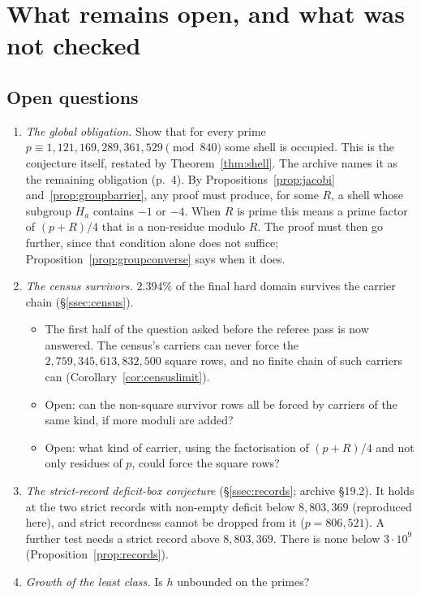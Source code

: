\section{What remains open, and what was not checked}\label{sec:open}

\subsection{Open questions}

\begin{enumerate}[label=\arabic*.]
\item \emph{The global obligation.} Show that for every prime $p\equiv1,121,169,289,361,529\pmod{840}$ some shell is occupied. This is the conjecture itself, restated by Theorem~\ref{thm:shell}. The archive names it as the remaining obligation (p.~4). By Propositions~\ref{prop:jacobi} and~\ref{prop:groupbarrier}, any proof must produce, for some $R$, a shell whose subgroup $H_a$ contains $-1$ or $-4$. When $R$ is prime this means a prime factor of $(p+R)/4$ that is a non-residue modulo $R$. The proof must then go further, since that condition alone does not suffice; Proposition~\ref{prop:groupconverse} says when it does.
\item \emph{The census survivors.} $2.394\%$ of the final hard domain survives the carrier chain (§\ref{ssec:census}).
\begin{itemize}
\item The first half of the question asked before the referee pass is now answered. The census's carriers can never force the $2{,}759{,}345{,}613{,}832{,}500$ square rows, and no finite chain of such carriers can (Corollary~\ref{cor:censuslimit}).
\item Open: can the non-square survivor rows all be forced by carriers of the same kind, if more moduli are added?
\item Open: what kind of carrier, using the factorisation of $(p+R)/4$ and not only residues of $p$, could force the square rows?
\end{itemize}
\item \emph{The strict-record deficit-box conjecture} (§\ref{ssec:records}; archive §19.2). It holds at the two strict records with non-empty deficit below $8{,}803{,}369$ (reproduced here), and strict recordness cannot be dropped from it ($p=806{,}521$). A further test needs a strict record above $8{,}803{,}369$. There is none below $3\cdot10^9$ (Proposition~\ref{prop:records}).
\item \emph{Growth of the least class.} Is $h$ unbounded on the primes?

\end{enumerate}

